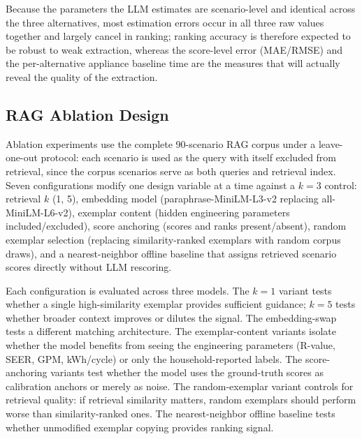 \documentclass[final,3p,times]{elsarticle}
\begin{document}
Because the parameters the LLM estimates are scenario-level and identical across the three alternatives, most estimation errors occur in all three raw values together and largely cancel in ranking; ranking accuracy is therefore expected to be robust to weak extraction, whereas the score-level error (MAE/RMSE) and the per-alternative appliance baseline time are the measures that will actually reveal the quality of the extraction.

\subsection{RAG Ablation Design}
\label{sec:rag-ablation-methods}
Ablation experiments use the complete 90-scenario RAG corpus under a leave-one-out protocol: each scenario is used as the query with itself excluded from retrieval, since the corpus scenarios serve as both queries and retrieval index. Seven configurations modify one design variable at a time against a $k=3$ control: retrieval $k$ (1, 5), embedding model (paraphrase-MiniLM-L3-v2 replacing all-MiniLM-L6-v2), exemplar content (hidden engineering parameters included/excluded), score anchoring (scores and ranks present/absent), random exemplar selection (replacing similarity-ranked exemplars with random corpus draws), and a nearest-neighbor offline baseline that assigns retrieved scenario scores directly without LLM rescoring.

Each configuration is evaluated across three models. The $k=1$ variant tests whether a single high-similarity exemplar provides sufficient guidance; $k=5$ tests whether broader context improves or dilutes the signal. The embedding-swap tests a different matching architecture. The exemplar-content variants isolate whether the model benefits from seeing the engineering parameters (R-value, SEER, GPM, kWh/cycle) or only the household-reported labels. The score-anchoring variants test whether the model uses the ground-truth scores as calibration anchors or merely as noise. The random-exemplar variant controls for retrieval quality: if retrieval similarity matters, random exemplars should perform worse than similarity-ranked ones. The nearest-neighbor offline baseline tests whether unmodified exemplar copying provides ranking signal.
\end{document}
